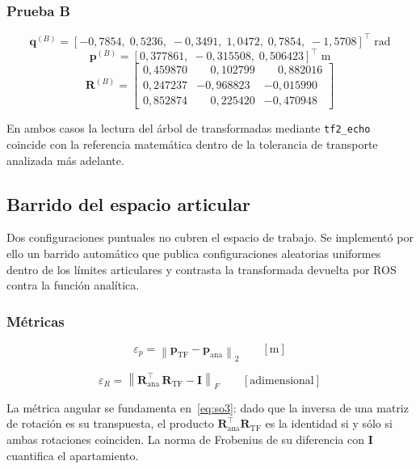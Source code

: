 \documentclass[11pt,a4paper]{article}
\newcommand{\mat}[1]{\mathbf{#1}}
\begin{document}
\subsubsection*{Prueba B}
\[
\mat{q}^{(B)} = [-0{,}7854,\; 0{,}5236,\; -0{,}3491,\; 1{,}0472,\; 0{,}7854,\; -1{,}5708]^{\top}\;\mathrm{rad}
\]
\[
\mat{p}^{(B)} = [0{,}377861,\; -0{,}315508,\; 0{,}506423]^{\top}\;\mathrm{m}
\]
\[
\mat{R}^{(B)} =
\begin{bmatrix}
0{,}459870 & \phantom{-}0{,}102799 & \phantom{-}0{,}882016\\
0{,}247237 & -0{,}968823 & -0{,}015990\\
0{,}852874 & \phantom{-}0{,}225420 & -0{,}470948
\end{bmatrix}
\]

En ambos casos la lectura del árbol de transformadas mediante
\texttt{tf2\_echo} coincide con la referencia matemática dentro de la
tolerancia de transporte analizada más adelante.

\subsection{Barrido del espacio articular}

Dos configuraciones puntuales no cubren el espacio de trabajo. Se
implementó por ello un barrido automático que publica configuraciones
aleatorias uniformes dentro de los límites articulares y contrasta la
transformada devuelta por ROS contra la función analítica.

\subsubsection*{Métricas}

\begin{equation}
\varepsilon_p = \left\| \mat{p}_{\mathrm{TF}} - \mat{p}_{\mathrm{ana}} \right\|_2
\qquad [\mathrm{m}]
\end{equation}

\begin{equation}
\varepsilon_R = \left\| \mat{R}_{\mathrm{ana}}^{\top}\,\mat{R}_{\mathrm{TF}} - \mat{I} \right\|_F
\qquad [\text{adimensional}]
\end{equation}

La métrica angular se fundamenta en~\eqref{eq:so3}: dado que la inversa
de una matriz de rotación es su transpuesta, el producto
$\mat{R}_{\mathrm{ana}}^{\top}\mat{R}_{\mathrm{TF}}$ es la identidad si
y sólo si ambas rotaciones coinciden. La norma de Frobenius de su
diferencia con $\mat{I}$ cuantifica el apartamiento.
\end{document}
